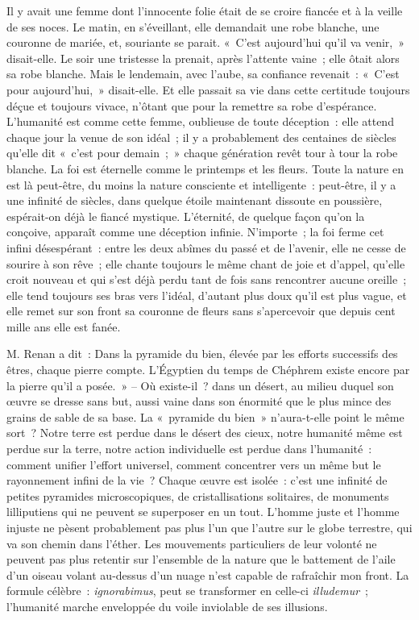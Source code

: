 \documentclass[french,twoside]{book} %
\begin{document}
Il y avait une femme dont l’innocente folie était de se croire fiancée et à la veille de ses noces. Le matin, en s’éveillant, elle demandait une robe blanche, une couronne de mariée, et, souriante se parait. « C’est aujourd’hui qu’il va venir, » disait-elle. Le soir une tristesse la prenait, après l’attente vaine ; elle ôtait alors sa robe blanche. Mais le lendemain, avec l’aube, sa confiance revenait : « C’est pour aujourd’hui, » disait-elle. Et elle passait sa vie dans cette certitude toujours déçue et toujours vivace, n’ôtant que pour la remettre sa robe d’espérance. L’humanité est comme cette femme, oublieuse de toute déception : elle attend chaque jour la venue de son idéal ; il y a probablement des centaines de siècles qu’elle dit « c’est pour demain ; » chaque génération revêt tour à tour la robe blanche. La foi est éternelle comme le printemps et les fleurs. Toute la nature en est là peut-être, du moins la nature consciente et intelligente : peut-être, il y a une infinité de siècles, dans quelque étoile maintenant dissoute en poussière, espérait-on déjà le fiancé mystique. L’éternité, de quelque façon qu’on la conçoive, apparaît comme une déception infinie. N’importe ; la foi ferme cet infini désespérant : entre les deux abîmes du passé et de l’avenir, elle ne cesse de sourire à son rêve ; elle chante toujours le même chant de joie et d’appel, qu’elle croit nouveau et qui s’est déjà perdu tant de fois sans rencontrer aucune oreille ; elle tend toujours ses bras vers l’idéal, d’autant plus doux qu’il est plus vague, et elle remet sur son front sa couronne de fleurs sans s’apercevoir que depuis cent mille ans elle est fanée.\par
M. Renan a dit : Dans la pyramide du bien, élevée par les efforts successifs des êtres, chaque pierre compte. L’Égyptien du temps de Chéphrem existe encore par la pierre qu’il a posée. » – Où existe-il ? dans un désert, au milieu duquel son œuvre se dresse sans but, aussi vaine dans son énormité que le plus mince des grains de sable de sa base. La « pyramide du bien » n’aura-t-elle point le même sort ? Notre terre est perdue dans le désert des cieux, notre humanité même est perdue sur la terre, notre action individuelle est perdue dans l’humanité : comment unifier l’effort universel, comment concentrer vers un même but le rayonnement infini de la vie ? Chaque œuvre est isolée : c’est une infinité de petites pyramides microscopiques, de cristallisations solitaires, de monuments lilliputiens qui ne peuvent se superposer en un tout. L’homme juste et l’homme injuste ne pèsent probablement pas plus l’un que l’autre sur le globe terrestre, qui va son chemin dans l’éther. Les mouvements particuliers de leur volonté ne peuvent pas plus retentir sur l’ensemble de la nature que le battement de l’aile d’un oiseau volant au-dessus d’un nuage n’est capable de rafraîchir mon front. La formule célèbre : \emph{ignorabimus}, peut se transformer en celle-ci \emph{illudemur} ; l’humanité marche enveloppée du voile inviolable de ses illusions.\par
\end{document}
